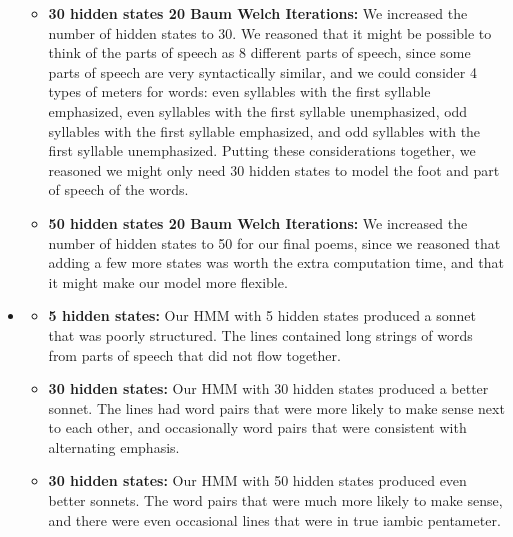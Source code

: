 \begin{itemize}
\begin{itemize}
    \item \textbf{30 hidden states 20 Baum Welch Iterations:} We increased the number of hidden states to 30. We reasoned that it might be possible to think of the parts of speech as 8 different parts of speech, since some parts of speech are very syntactically similar, and we could consider 4 types of meters for words:
    even syllables with the first syllable emphasized,
    even syllables with the first syllable unemphasized,
    odd syllables with the first syllable emphasized,
    and odd syllables with the first syllable unemphasized. Putting these considerations together, we reasoned we might only need 30 hidden states to model the foot and part of speech of the words.

    \item \textbf{50 hidden states 20 Baum Welch Iterations:} We increased the number of hidden states to 50 for our final poems, since we reasoned that adding a few more states was worth the extra computation time, and that it might make our model more flexible.

    \end{itemize}

    \item {}
    \begin{itemize}
    \item \textbf{5 hidden states:}
        Our HMM with 5 hidden states produced a sonnet that was poorly structured. The lines contained long strings of words from parts of speech that did not flow together.

    \item \textbf{30 hidden states:}
        Our HMM with 30 hidden states produced a better sonnet. The lines had word pairs that were more likely to make sense next to each other, and occasionally word pairs that were consistent with alternating emphasis.

    \item \textbf{30 hidden states:}
        Our HMM with 50 hidden states produced even better sonnets. The word pairs that were much more likely to make sense, and there were even occasional lines that were in true iambic pentameter.

    \end{itemize}


\end{itemize}




